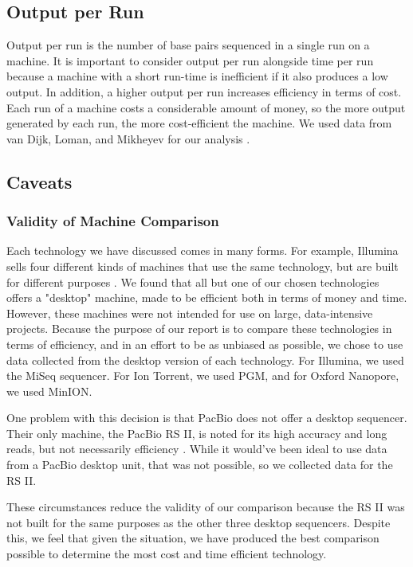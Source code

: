 \documentclass[12pt,letterpaper]{report}
\begin{document}
\subsection{Output per Run}

Output per run is the number of base pairs sequenced in a single run on a machine. It is important to consider output per run alongside time per run because a machine with a short run-time is inefficient if it also produces a low output. In addition, a higher output per run increases efficiency in terms of cost. Each run of a machine costs a considerable amount of money, so the more output generated by each run, the more cost-efficient the machine. We used data from van Dijk, Loman, and Mikheyev for our analysis \cite{van_Dijk,Loman,Mikheyev}. 

\subsection{Caveats}

\subsubsection{Validity of Machine Comparison}

Each technology we have discussed comes in many forms. For example, Illumina sells four different kinds of machines that use the same technology, but are built for different purposes \cite{illuminasite}. We found that all but one of our chosen technologies offers a "desktop" machine, made to be efficient both in terms of money and time. However, these machines were not intended for use on large, data-intensive projects. Because the purpose of our report is to compare these technologies in terms of efficiency, and in an effort to be as unbiased as possible, we chose to use data collected from the desktop version of each technology. For Illumina, we used the MiSeq sequencer. For Ion Torrent, we used PGM, and for Oxford Nanopore, we used MinION.

One problem with this decision is that PacBio does not offer a desktop sequencer. Their only machine, the PacBio RS II, is noted for its high accuracy and long reads, but not necessarily efficiency \cite{pacbiosite}. While it would've been ideal to use data from a PacBio desktop unit, that was not possible, so we collected data for the RS II.

These circumstances reduce the validity of our comparison because the RS II was not built for the same purposes as the other three desktop sequencers. Despite this, we feel that given the situation, we have produced the best comparison possible to determine the most cost and time efficient technology.
\end{document}
